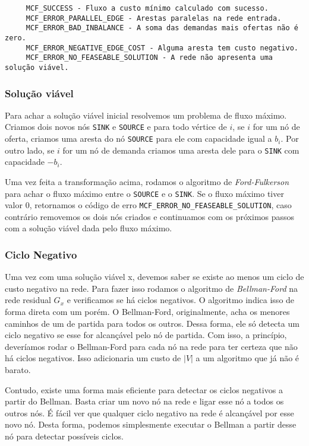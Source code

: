 \documentclass[12pt]{article}
\begin{document}
\begin{verbatim}
     MCF_SUCCESS - Fluxo a custo mínimo calculado com sucesso. 
     MCF_ERROR_PARALLEL_EDGE - Arestas paralelas na rede entrada.
     MCF_ERROR_BAD_INBALANCE - A soma das demandas mais ofertas não é zero.
     MCF_ERROR_NEGATIVE_EDGE_COST - Alguma aresta tem custo negativo.
     MCF_ERROR_NO_FEASEABLE_SOLUTION - A rede não apresenta uma solução viável.
\end{verbatim}

\subsubsection{Solução viável}

Para achar a solução viável inicial resolvemos um problema de fluxo máximo. 
Criamos dois novos nós \texttt{SINK} e \texttt{SOURCE} e para todo 
vértice de $i$, se $i$ for um nó de oferta, criamos uma aresta do nó \texttt{SOURCE}
para ele com capacidade igual a $b_i$. Por outro lado, se $i$ for um nó de demanda 
criamos uma aresta dele para o \texttt{SINK} com capacidade $-b_i$. 

Uma vez feita a transformação acima, rodamos o algoritmo de \emph{Ford-Fulkerson} para
achar o fluxo máximo entre o \texttt{SOURCE} e o \texttt{SINK}. Se o fluxo máximo tiver
valor $0$, retornamos o código de erro \verb|MCF_ERROR_NO_FEASEABLE_SOLUTION|, caso contrário
removemos os dois nós criados e continuamos com os próximos passos com a solução viável dada pelo fluxo máximo.

\subsubsection{Ciclo Negativo}

Uma vez com uma solução viável x, devemos saber se existe ao menos um ciclo de custo negativo
na rede. Para fazer isso rodamos o algoritmo de \emph{Bellman-Ford} na rede residual $G_x$ e verificamos se  
há ciclos negativos. O algoritmo indica isso de forma direta com um porém. O Bellman-Ford, originalmente, 
acha os menores caminhos de um de partida para todos os outros. Dessa forma, ele só detecta um ciclo
negativo se esse for alcançável pelo nó de partida. Com isso, a princípio, deveríamos rodar o Bellman-Ford
para cada nó na rede para ter certeza que não há ciclos negativos. Isso adicionaria um custo de $|V|$
a um algoritmo que já não é barato. 

Contudo, existe uma forma mais eficiente para detectar os ciclos
negativos a partir do Bellman. Basta criar um novo nó na rede e ligar esse nó a 
todos os outros nós. É fácil ver que qualquer ciclo negativo na rede é alcançável por esse novo nó.   
Desta forma, podemos simplesmente executar o Bellman a partir desse nó para detectar possíveis 
ciclos.
\end{document}
